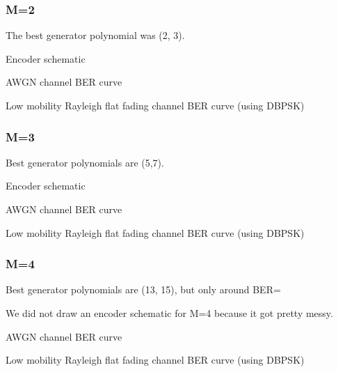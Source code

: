 \documentclass[a4paper,10pt]{article}
\begin{document}
\subsubsection{M=2}

\begin{outline}
  \item The best generator polynomial was (2, 3).
  \item Encoder schematic

  \item AWGN channel BER curve

  \item Low mobility Rayleigh flat fading channel BER curve (using DBPSK)
\end{outline}


\subsubsection{M=3}

\begin{outline}
  \item Best generator polynomials are (5,7).
  \item Encoder schematic

  \item AWGN channel BER curve

  \item Low mobility Rayleigh flat fading channel BER curve (using DBPSK)
\end{outline}

\subsubsection{M=4}

\begin{outline}
  \item Best generator polynomials are (13, 15), but only around BER=\ber

  \item We did not draw an encoder schematic for M=4 because it got pretty messy.

  \item AWGN channel BER curve

  \item Low mobility Rayleigh flat fading channel BER curve (using DBPSK)
\end{outline}
\end{document}
